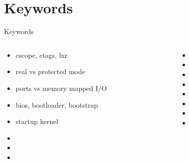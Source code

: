 \documentclass{workshop}
\begin{document}
\section{Keywords}

\begin{frame}{Keywords}
  \begin{columns}
    \begin{column}[l]{0.5\textwidth}
      \begin{itemize}
        \item cscope, ctags, lxr
        \item real vs protected mode
        \item ports vs memory mapped I/O
        \item bios, bootloader, bootstrap
        \item startup kernel
        \item 
        \item 
        \item 
      \end{itemize}
    \end{column}
    \begin{column}[l]{0.5\textwidth}
      \begin{itemize}
        \item 
        \item 
        \item 
        \item 
        \item 
        \item 
        \item 
        \item 
      \end{itemize}
    \end{column}
  \end{columns}
\end{frame}
\end{document}
